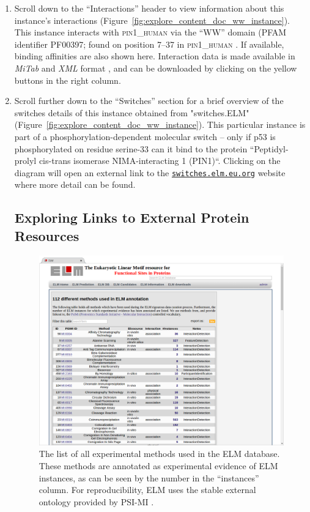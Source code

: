 \documentclass[12pt]{article}
\newcommand\rurl[1]{%
	\href{http://#1}{\nolinkurl{#1}}%
}
\newcommand\uniprot[1]{%
	\textsc{\lowercase{#1}}%
}
\newcommand\fileformat[1]{%
    \textit{#1}{}%
}%
\begin{document}
\begin{enumerate}
\item Scroll down to the ``Interactions'' header to view information about this
	instance's interactions
	(Figure~\ref{fig:explore_content_doc_ww_instance}). This instance
	interacts with \uniprot{PIN1\_Human} via the ``WW'' domain (PFAM identifier
	PF00397; found on position 7--37 in \uniprot{PIN1\_Human}. If available,
	binding affinities are also shown here. Interaction data is made
	available in \fileformat{MiTab} and \fileformat{XML} format
	\citep{17925023}, and can be downloaded by clicking on the yellow
	buttons in the right column.

\item Scroll further down to the ``Switches'' section for a brief overview of
	the switches details of this instance obtained from "switches.ELM"
	\citep{23550212} (Figure~\ref{fig:explore_content_doc_ww_instance}). This
	particular instance is part of a phosphorylation-dependent molecular switch --
	only if p53 is phosphorylated on residue serine-33 can it bind to the protein
	``Peptidyl-prolyl cis-trans isomerase NIMA-interacting 1 (PIN1)``.
	Clicking on the diagram will open an external link to the
	\rurl{switches.elm.eu.org} website where more detail can be found.

%
%
\subsection*{Exploring Links to External Protein Resources}
\label{subsec:explore_content_links_to_external_resources}

\begin{figure}[h!]
	\centering
	\includegraphics[width=\textwidth]{Figures/explore_content/methods.png}
	\caption{
		The list of all experimental methods used in the ELM database.
		These methods are annotated as experimental evidence of ELM
		instances, as can be seen by the number in the ``instances''
		column. For reproducibility, ELM uses the stable external
		ontology provided by PSI-MI \citep{17925023}.
	}
	\label{fig:explore_content_methods}
\end{figure}


\end{enumerate}
\end{document}
